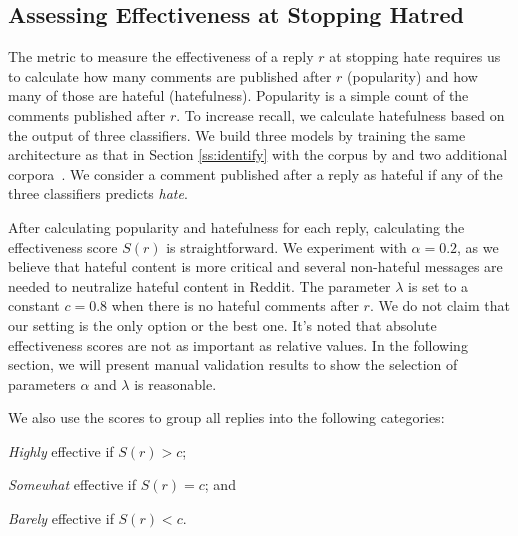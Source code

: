 \documentclass[11pt]{article}
\begin{document}
\subsection{Assessing Effectiveness at Stopping Hatred}
\label{ss:assess}
The metric to measure the effectiveness of a reply $r$ at stopping hate requires us to calculate
how many comments are published after $r$ (popularity)
and how many of those are hateful (hatefulness).
Popularity is a simple count of the comments published after $r$.
To increase recall, we calculate hatefulness based on the output of three classifiers.
We build three models by training the same architecture as that in Section \ref{ss:identify} with the corpus by \citet{qian-etal-2019-benchmark}
and two additional corpora~\cite{hateoffensive,vidgen-etal-2021-introducing}.
We consider a comment published after a reply as hateful if any of the three classifiers predicts \emph{hate}. 


After calculating popularity and hatefulness for each reply,
calculating the effectiveness score $S(r)$ is straightforward.
We experiment with $\alpha = 0.2$, as we believe that hateful content is more critical and several non-hateful messages are needed to neutralize hateful content in Reddit.
The parameter $\lambda$ is set to a constant $c= 0.8$ when there is no hateful comments after $r$.
We do not claim that our setting is the only option or the best one. It's noted that absolute effectiveness scores are not as important as relative values.
In the following section, we will present manual validation results to show the selection of parameters $\alpha$ and $\lambda$ is reasonable. 

We also use the scores to group all replies into the following categories:
\begin{compactitem}
	\item \emph{Highly} effective if $S(r) > c$;
	\item \emph{Somewhat} effective if $S(r) = c$; and
	\item \emph{Barely} effective if $S(r) < c$.
\end{compactitem}
\end{document}
